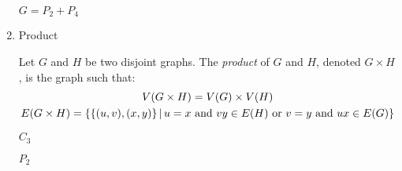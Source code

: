 \documentclass[letterpaper,12pt,fleqn]{article}
\begin{document}
\begin{enumerate}[left=0pt]
\begin{example}
\begin{center}
      \(G=P_2+P_4\)
    \end{center}
  \end{example}

\item Product

  \begin{definition}[Product]
    Let \(G\) and \(H\) be two disjoint graphs.  The \emph{product} of \(G\) and \(H\), denoted \(G\times H\), is
    the graph such that:
    \begin{gather*}
      V(G\times H)=V(G)\times V(H) \\
      E(G\times H)=\setb{\set{(u,v),(x,y)}}{u=x\ \text{and}\ vy\in E(H)\ \text{or}\ v=y\ \text{and}\ ux\in E(G)}
    \end{gather*}
  \end{definition}

  \begin{example}
    \begin{minipage}{1.5in}
      \begin{center}

        \bigskip

        \(C_3\)
      \end{center}
    \end{minipage}
    \begin{minipage}{1.5in}
      \begin{center}

        \bigskip

        \(P_2\)
      \end{center}
    \end{minipage}
    \begin{minipage}{3in}
      \begin{center}


\end{center}
\end{minipage}
\end{example}
\end{enumerate}
\end{document}
